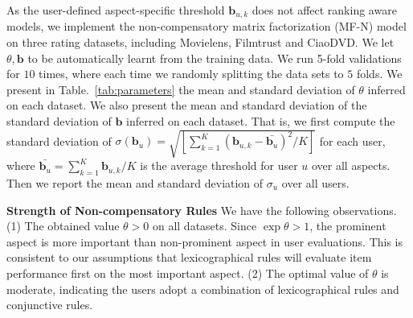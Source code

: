 \documentclass[letterpaper]{article} %
\begin{document}
As the user-defined aspect-specific threshold $\mathbf{b}_{u,k}$ does not affect ranking aware models, we implement the non-compensatory matrix factorization (MF-N) model on three rating datasets, including Movielens, Filmtrust and CiaoDVD. We let $\theta,\mathbf{b}$ to be automatically learnt from the training data. We run 5-fold validations for $10$ times, where each time we randomly splitting the data sets to $5$ folds. We present in Table.~\ref{tab:parameters} the mean and standard deviation of $\theta$ inferred on each dataset. We also present the mean and standard deviation of the standard deviation of $\mathbf{b}$ inferred on each dataset. That is, we first compute the standard deviation of $\sigma(\mathbf{b}_u)=\sqrt {[\sum_{k=1}^{K} (\mathbf{b}_{u,k}-\bar{\mathbf{b}_u})^2 /K]} $ for each user, where $\bar{\mathbf{b}_u}=\sum_{k=1}^K \mathbf{b}_{u,k} /K$ is the average threshold for user $u$ over all aspects. Then we report the mean and standard deviation of $\sigma_u$ over all users. 


\textbf{Strength of Non-compensatory Rules}
We have the following observations. (1) The obtained value $\theta>0$ on all datasets. Since $\exp\theta>1$, the prominent aspect is more important than non-prominent aspect in user evaluations. This is consistent to our assumptions that lexicographical rules will evaluate item performance first on the most important aspect. (2)  The optimal value of $\theta$ is  moderate, indicating the users adopt a combination of lexicographical rules and conjunctive rules.  
%
% 
%
\end{document}
